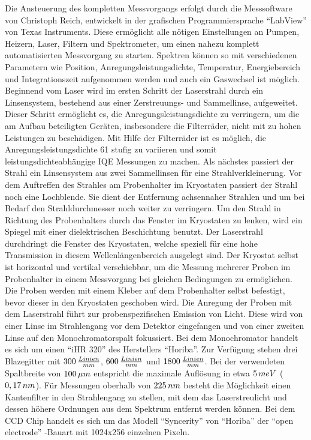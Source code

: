 Die Ansteuerung des kompletten Messvorgangs erfolgt durch die Messsoftware von Christoph Reich, entwickelt in der grafischen Programmiersprache "`LabView"' von Texas Instruments. Diese ermöglicht alle nötigen Einstellungen an Pumpen, Heizern, Laser, Filtern und Spektrometer, um einen nahezu komplett automatisierten Messvorgang zu starten. Spektren können so mit verschiedenen Parametern wie Position, Anregungsleistungsdichte, Temperatur, Energiebereich und Integrationszeit aufgenommen werden und auch ein Gaswechsel ist möglich.
\newline
Beginnend vom Laser wird im ersten Schritt der Laserstrahl durch ein Linsensystem, bestehend aus einer Zerstreuungs- und Sammellinse, aufgeweitet. Dieser Schritt ermöglicht es, die Anregungsleistungsdichte zu verringern, um die am Aufbau beteiligten Geräten, insbesondere die Filterräder, nicht mit zu hohen Leistungen zu beschädigen. Mit Hilfe der Filterräder ist es möglich, die Anregungsleistungsdichte 61 stufig zu variieren und somit leistungsdichteabhängige IQE Messungen zu machen. Als nächstes passiert der Strahl ein Linsensystem aus zwei Sammellinsen für eine Strahlverkleinerung. Vor dem Auftreffen des Strahles am Probenhalter im Kryostaten passiert der Strahl noch eine Lochblende. Sie dient der Entfernung achsennaher Strahlen und um bei Bedarf den Strahldurchmesser noch weiter zu verringern. 
\newline
Um den Strahl in Richtung des Probenhalters durch das Fenster im Kryostaten zu lenken, wird ein Spiegel mit einer dielektrischen Beschichtung benutzt. Der Laserstrahl durchdringt die Fenster des Kryostaten, welche speziell für eine hohe Transmission in diesem Wellenlängenbereich ausgelegt sind. Der Kryostat selbst ist horizontal und vertikal verschiebbar, um die Messung mehrerer Proben im Probenhalter in einem Messvorgang bei gleichen Bedingungen zu ermöglichen. Die Proben werden mit einem Kleber auf dem Probenhalter selbst befestigt, bevor dieser in den Kryostaten geschoben wird. 
Die Anregung der Proben mit dem Laserstrahl führt zur probenspezifischen Emission von Licht. Diese wird von einer Linse im Strahlengang vor dem Detektor eingefangen und von einer zweiten Linse auf den Monochromatorspalt fokussiert.
\newline
Bei dem Monochromator handelt es sich um einen "`iHR 320"' des Herstellers "`Horiba"'. Zur Verfügung stehen drei Blazegitter mit $300 \thinspace \frac{Linien}{mm}$,
$600 \thinspace \frac{Linien}{mm}$ und $1800 \thinspace \frac{Linien}{mm}$. Bei der verwendeten Spaltbreite von $100 \thinspace \mu m$ entspricht die maximale Auflösung in etwa $5 \thinspace meV$ ($0,17 \thinspace nm$). Für Messungen oberhalb von $225 \thinspace nm$ besteht die Möglichkeit einen Kantenfilter in den Strahlengang zu stellen, mit dem das Laserstreulicht und dessen höhere Ordnungen aus dem Spektrum entfernt werden können. Bei dem CCD Chip handelt es sich um das Modell "`Syncerity"' von "`Horiba"' der "`open electrode"' -Bauart mit 1024x256 einzelnen Pixeln. 

